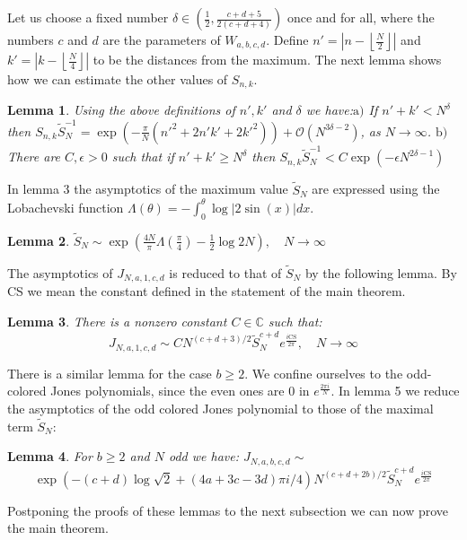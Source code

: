 \documentclass[letterpaper]{article}
\newtheorem{lem}{Lemma}
\begin{document}
Let us choose a fixed number $\delta \in (\frac{1}{2},\frac{c+d+5}{2(c+d+4)})$
once and for all, where the numbers $c$ and $d$ are the parameters
of $W_{a,b,c,d}$. Define $n'=|n-\left\lfloor\frac{N}{2}\right\rfloor|$ and $k' =
|k-\left\lfloor\frac{N}{4}\right\rfloor|$ to be the distances from
the maximum. The next lemma shows how we can estimate the other
values of $S_{n,k}$.

\begin{lem} Using the above definitions of $n',k'$ and
$\delta$ we have:\newline $\mathrm{a)}$ If $n'+k' < N^\delta$ then
$S_{n,k}\tilde{S}_N^{-1} = \exp(-\frac{\pi}{N}(n'^2+2n'k'+2k'^2))
+ \mathcal{O}(N^{3\delta - 2})$, as $N \to \infty$. \newline $\mathrm{b)}$ There are $C,\epsilon >
0$ such that if $n'+k' \geq N^\delta$ then
$S_{n,k}\tilde{S}_N^{-1} < C \exp(-\epsilon N^{2\delta - 1})$
\end{lem}
\noindent In lemma 3 the asymptotics of the maximum value $\tilde{S}_N$ are expressed using the Lobachevski function $\Lambda(\theta) = -\int_0^{\theta}\log|2\sin(x)|dx$.
\begin{lem}
$\tilde{S}_N \sim \exp\left(
\frac{4N}{\pi}\Lambda(\frac{\pi}{4})-\frac{1}{2}\log2N \right), \quad N\to\infty$
\end{lem}
\noindent The asymptotics of $J_{N,a,1,c,d}$ is reduced to that of
$\tilde{S}_N$ by the following lemma. By CS we mean the constant defined in the statement of the main theorem.
\begin{lem} There is a nonzero constant $C \in \mathbb{C}$ such that:
$$J_{N,a,1,c,d}\sim CN^{(c+d+3)/2}\tilde{S}_N^{c+d}e^{\frac{i\mathrm{CS}}{2\pi}},\quad N\to\infty$$
\end{lem}

\noindent There is a similar lemma for the case $b \geq 2$. We confine ourselves to the odd-colored Jones
polynomials, since the even ones are $0$ in $e^{\frac{2\pi
i}{N}}$. In lemma 5 we reduce the asymptotics of the odd colored
Jones polynomial to those of the maximal term $\tilde{S}_N$:

\begin{lem} For $b\geq 2$ and $N$ odd we have: $J_{N,a,b,c,d}\sim $
$$\exp\left(-(c+d)\log\sqrt{2}+(4a+3c-3d)\pi i/4\right) N^{(c+d+2b)/2}\tilde{S}_N^{c+d}e^{\frac{i\mathrm{CS}}{2\pi}}$$
\end{lem}

\noindent Postponing the proofs of these lemmas to the next subsection we
can now prove the main theorem.
\end{document}
